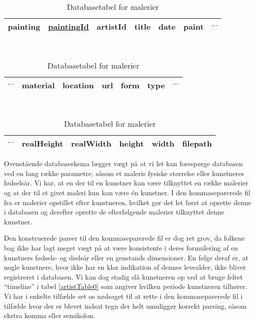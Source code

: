 {\begin{table}[!h]
    \centering
    \begin{tabular}{|l||c|c|c|c|c|c}
        \hline
        \bf{painting} \hspace{0.5cm} & \underline{paintingId} & artistId & title & date & paint & $\cdots$ \\\hline
    \end{tabular}\\ \vspace{0.2cm}\hspace{1.2cm}
    \begin{tabular}{c|c|c|c|c|c|c}
        \hline
        $\cdots$ & material & location & url & form & type & $\cdots$ \\\hline
    \end{tabular}\\ \vspace{0.2cm}\hspace{1.4cm}
    \begin{tabular}{c|c|c|c|c|c|}
        \hline
        $\cdots$ & realHeight & realWidth & height & width & filepath \\\hline
    \end{tabular}
    \caption{Databasetabel for malerier}
    \label{paintingTable0}
\end{table}

Ovenstående databaseskema lægger vægt på at vi let kan forespørge
databasen ved en lang række parametre, såsom et maleris fysiske
størrelse eller kunstneres fødselsår. Vi har, at en der til en kunstner
kan være tilknyttet en række malerier og at der til et givet maleri kun
kan være én kunstner. I den kommaseparerede fil fra \cite{wgahu} er
malerier opstillet efter kunstneren, hvilket gør det let først at
oprette denne i databasen og derefter oprette de efterfølgende malerier
tilknyttet denne kunstner.

Den konstruerede parser til den kommaseparerede fil er dog ret grov, da
folkene bag \cite{wgahu} ikke har lagt meget vægt på at være konsistente
i deres formulering af en kunstners fødsels- og dødsår eller en
genstands dimensioner. En følge deraf er, at nogle kunstnere, hvor
\cite{wgahu} ikke har en klar indikation af dennes levealder, ikke bliver
registreret i databasen. Vi kan dog stadig slå kunstneren op ved at
bruge feltet ``timeline'' i tabel \ref{artistTable0} som angiver hvilken
periode kunstneren tilhører. Vi har i enkelte tilfælde set os nødsaget
til at rette i den kommaseparerede fil i tilfælde hvor der er blevet
indsat tegn der helt umuliggør korrekt parsing, såsom ekstra komma
eller semikolon.

}
